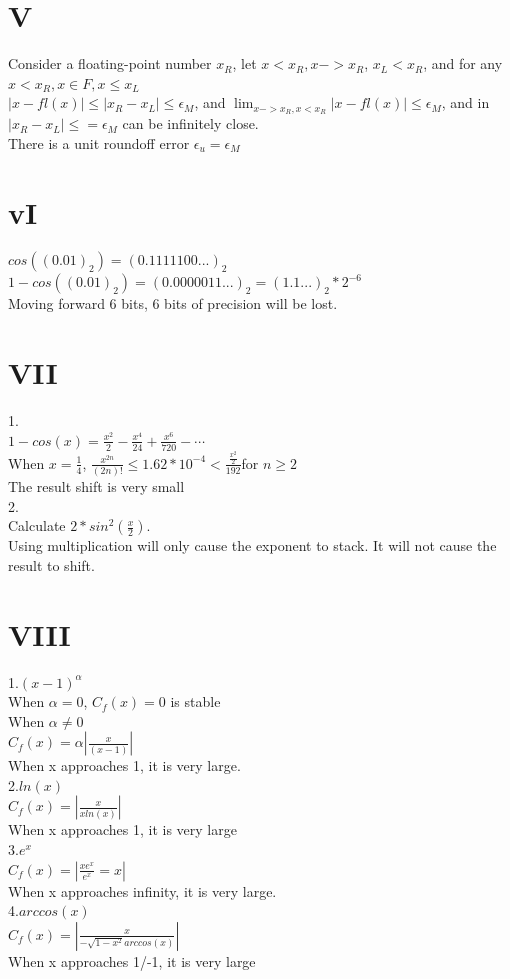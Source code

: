 \documentclass[a4paper]{article}
\begin{document}
\section*{V}
Consider a floating-point number $x_R$, let $x<x_R,x -> x_R$, $x_L<x_R$, and for any $x<x_R,x\in F,x\leq x_L$\\
$|x-fl(x)|\leq |x_R-x_L|\leq \epsilon_M$, and $\lim_{x->x_R,x<x_R}|x-fl(x)|\leq \epsilon_M$, and in $|x_R-x_L|\leq =\epsilon_M$ can be infinitely close.\\
There is a unit roundoff error $\epsilon_u=\epsilon_M$\\

\section*{vI}

$cos((0.01)_2)=(0.1111100...)_2$\\
$1-cos((0.01)_2)=(0.0000011...)_2=(1.1...)_2*2^{-6}$\\
Moving forward 6 bits, 6 bits of precision will be lost.\\

\section*{VII}

1.\\
$1-cos(x)=\frac{x^2}{2} - \frac{x^4}{24} + \frac{x^6}{720} - \cdots$\\
When $x=\frac{1}{4}$, $\frac{x^{2n}}{(2n)!}\leq1.62*10^{-4}<\frac{\frac{x^2}{2}}{192}$for $n\geq 2$\\
The result shift is very small\\

2.\\
Calculate $2*sin^2(\frac{x}{2})$.\\
Using multiplication will only cause the exponent to stack. It will not cause the result to shift.\\

\section*{VIII}

1.$(x-1)^\alpha$\\
When $\alpha =0$, $C_f(x)=0$ is stable\\
When $\alpha \neq 0$\\
$C_f(x)=\alpha|\frac{x}{(x-1)}|$\\
When x approaches 1, it is very large.\\
2.$ln(x)$\\
$C_f(x)=|\frac{x}{xln(x)}|$\\
When x approaches 1, it is very large\\
3.$e^x$\\
$C_f(x)=|\frac{xe^x}{e^x}=x|$\\
When x approaches infinity, it is very large.\\
4.$arccos(x)$\\
$C_f(x)=|\frac{x}{-\sqrt{1-x^2}arccos(x)}|$\\
When x approaches 1/-1, it is very large\\
\end{document}
